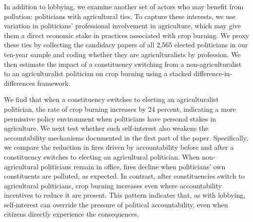 \documentclass[12pt]{article}
\begin{document}
In addition to lobbying, we examine another set of actors who may benefit from pollution: politicians with agricultural ties. To capture these interests, we use variation in politicians’ professional involvement in agriculture, which may give them a direct economic stake in practices associated with crop burning. We proxy these ties by collecting the candidacy papers of all 2,565 elected politicians in our ten-year sample and coding whether they are agriculturalists by profession. We then estimate the impact of a constituency switching from a non-agriculturalist to an agriculturalist politician on crop burning using a stacked difference-in-differences framework.

We find that when a constituency switches to electing an agriculturalist politician, the rate of crop burning increases by 24 percent, indicating a more permissive policy environment when politicians have personal stakes in agriculture.  We next test whether such self-interest also weakens the accountability mechanisms documented in the first part of the paper. Specifically, we compare the reduction in fires driven by accountability before and after a constituency switches to electing an agricultural politician. When non-agricultural politicians remain in office, fires decline when politicians' own constituents are polluted, as expected. In contrast, after constituencies switch to agricultural politicians, crop burning increases even where accountability incentives to reduce it are present. This pattern indicates that, as with lobbying,  self-interest can override the pressure of political accountability, even when citizens directly experience the consequences.

\end{document}
